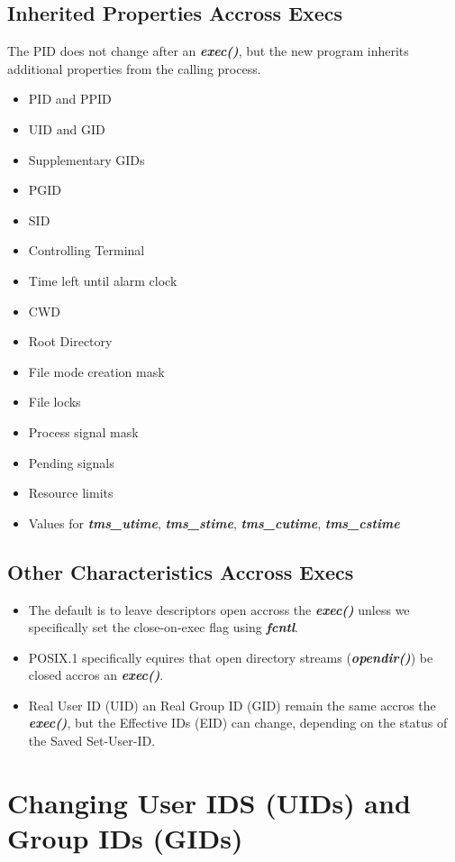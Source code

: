 \documentclass{article}
\newcommand\be[1]{\textbf{\emph{#1}}}
\begin{document}
\subsection{Inherited Properties Accross Execs}
The PID does not change after an \be{exec()}, but the new program 
inherits additional properties from the calling process.
\begin{itemize}
    \item PID and PPID
    \item UID and GID
    \item Supplementary GIDs
    \item PGID
    \item SID
    \item Controlling Terminal
    \item Time left until alarm clock
    \item CWD
    \item Root Directory
    \item File mode creation mask
    \item File locks
    \item Process signal mask
    \item Pending signals
    \item Resource limits
    \item Values for \be{tms\_utime}, \be{tms\_stime}, \be{tms\_cutime}, \be{tms\_cstime}
\end{itemize}

\subsection{Other Characteristics Accross Execs}
\begin{itemize}
    \item The default is to leave descriptors open accross the \be{exec()}
        unless we specifically set the close-on-exec flag using \be{fcntl}.
    \item POSIX.1 specifically equires that open directory streams (\be{opendir()})
        be closed accros an \be{exec()}.
    \item Real User ID (UID) an Real Group ID (GID) remain the same accros the 
        \be{exec()}, but the Effective IDs (EID) can change, depending on the 
        status of the Saved Set-User-ID.
\end{itemize}

\section{Changing User IDS (UIDs) and Group IDs (GIDs)}
\end{document}
